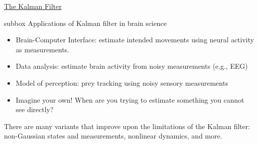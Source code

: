 \begin{textbox}{\href{http://instructor.compneuro.neuromatch.io/tutorials/W3D2_HiddenDynamics/instructor/W3D2_Tutorial3.html}{The Kalman Filter }   }
\begin{subbox}{subbox}{ Applications of Kalman filter in brain science}
\begin{itemize}
    \item  Brain-Computer Interface: estimate intended movements using neural activity as measurements.
\item Data analysis: estimate brain activity from noisy measurements (e.g., EEG)
\item Model of perception: prey tracking using noisy sensory measurements
\item Imagine your own! When are you trying to estimate something you cannot see directly?
\end{itemize}
There are many variants that improve upon the limitations of the Kalman filter: non-Gaussian states and measurements, nonlinear dynamics, and more.

\end{subbox}
\end{textbox}
